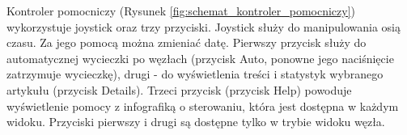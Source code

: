 
Kontroler pomocniczy (Rysunek \ref{fig:schemat_kontroler_pomocniczy}) wykorzystuje joystick oraz trzy przyciski. Joystick służy do manipulowania osią czasu. Za jego pomocą można zmieniać datę. Pierwszy przycisk służy do automatycznej wycieczki po węzłach (przycisk Auto, ponowne jego naciśnięcie zatrzymuje wycieczkę), drugi - do wyświetlenia treści i statystyk wybranego artykułu (przycisk Details). Trzeci przycisk (przycisk Help) powoduje wyświetlenie pomocy z infografiką o sterowaniu, która jest dostępna w każdym widoku. Przyciski pierwszy i drugi są dostępne tylko w trybie widoku węzła.

